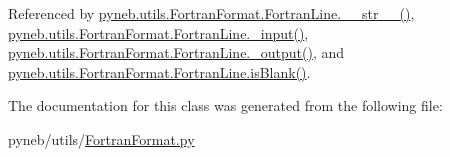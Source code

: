 Referenced by \hyperlink{_fortran_format_8py_source_l00141}{pyneb.\-utils.\-Fortran\-Format.\-Fortran\-Line.\-\_\-\-\_\-str\-\_\-\-\_\-()}, \hyperlink{_fortran_format_8py_source_l00155}{pyneb.\-utils.\-Fortran\-Format.\-Fortran\-Line.\-\_\-input()}, \hyperlink{_fortran_format_8py_source_l00195}{pyneb.\-utils.\-Fortran\-Format.\-Fortran\-Line.\-\_\-output()}, and \hyperlink{_fortran_format_8py_source_l00148}{pyneb.\-utils.\-Fortran\-Format.\-Fortran\-Line.\-is\-Blank()}.



The documentation for this class was generated from the following file\-:\begin{DoxyCompactItemize}
\item 
pyneb/utils/\hyperlink{_fortran_format_8py}{Fortran\-Format.\-py}\end{DoxyCompactItemize}
